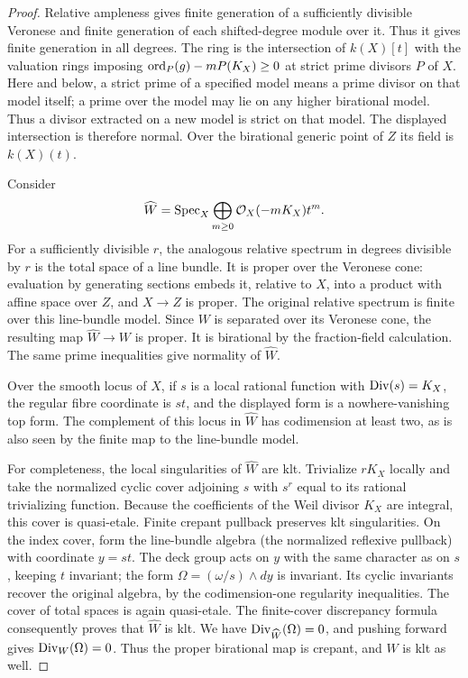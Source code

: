 \begin{proof}
Relative ampleness gives finite generation of a sufficiently divisible
Veronese and finite generation of each shifted-degree module over it.
Thus it gives finite generation in all degrees. The ring is the
intersection of \(k(X)[t]\) with the valuation rings imposing
\(\operatorname{ord}_P(g)-mP(K_X)\geq0\) at strict prime divisors \(P\) of \(X\).
Here and below, a strict prime of a specified model means a prime divisor
on that model itself; a prime over the model may lie on any higher
birational model. Thus a divisor extracted on a new model is strict on
that model. The displayed intersection is therefore normal. Over the birational generic point of \(Z\)
its field is \(k(X)(t)\).

Consider
\[
 \widehat W=\operatorname{Spec}_X\bigoplus_{m\geq0}\mathcal O_X(-mK_X)t^m .
\]
For a sufficiently divisible \(r\), the analogous relative spectrum in
degrees divisible by \(r\) is the total space of a line bundle. It is
proper over the Veronese cone: evaluation by generating sections embeds
it, relative to \(X\), into a product with affine space over \(Z\), and
\(X\to Z\) is proper. The original relative spectrum is finite over this
line-bundle model. Since \(W\) is separated over its Veronese cone, the
resulting map \(\widehat W\to W\) is proper. It is birational by the
fraction-field calculation. The same prime inequalities give normality
of \(\widehat W\).

Over the smooth locus of \(X\), if \(s\) is a local rational function with
\(\operatorname{Div}(s)=K_X\), the regular fibre coordinate is \(st\), and the displayed
form is a nowhere-vanishing top form. The complement of this locus in
\(\widehat W\) has codimension at least two, as is also seen by the finite
map to the line-bundle model.

For completeness, the local singularities of \(\widehat W\) are klt.
Trivialize \(rK_X\) locally and take the normalized cyclic cover adjoining
\(s\) with \(s^r\) equal to its rational trivializing function.
Because the coefficients of the Weil divisor \(K_X\) are integral,
this cover is quasi-etale. Finite crepant pullback preserves klt
singularities. On the index cover, form the line-bundle algebra
(the normalized reflexive pullback) with coordinate \(y=st\). The deck group acts on \(y\)
with the same character as on \(s\), keeping \(t\) invariant; the form
\(\Omega=(\omega/s)\wedge dy\) is invariant. Its cyclic invariants
recover the original algebra, by the codimension-one regularity inequalities.
The cover of total spaces is again quasi-etale. The finite-cover
discrepancy formula consequently proves that \(\widehat W\) is klt.
We have \(\operatorname{Div}_{\widehat W}(\Omega)=0\), and pushing forward gives
\(\operatorname{Div}_W(\Omega)=0\). Thus the proper birational map is crepant, and
\(W\) is klt as well.
\end{proof}


